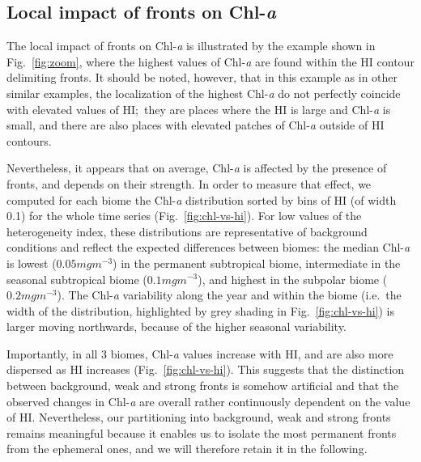 \subsection{Local impact of fronts on Chl\nobreakdash-\emph{a}}

The local impact of fronts on Chl\nobreakdash-\emph{a} is illustrated by the example shown in Fig.~\ref{fig:zoom}, where the highest values of Chl\nobreakdash-\emph{a} are found within the HI contour delimiting fronts.
It should be noted, however, that in this example as in other similar examples, the localization of the highest Chl\nobreakdash-\emph{a} do not perfectly coincide with elevated values of HI;\ they are places where the HI is large and Chl\nobreakdash-\emph{a} is small, and there are also places with elevated patches of Chl\nobreakdash-\emph{a} outside of HI contours.

Nevertheless, it appears that on average, Chl\nobreakdash-\emph{a} is affected by the presence of fronts, and depends on their strength.
In order to measure that effect, we computed for each biome the Chl\nobreakdash-\emph{a} distribution sorted by bins of HI (of width 0.1) for the whole time series (Fig.~\ref{fig:chl-vs-hi}).
For low values of the heterogeneity index, these distributions are representative of background conditions and reflect the expected differences between biomes: the median Chl\nobreakdash-\emph{a} is lowest (\(0.05 mg m^{-3}\)) in the permanent subtropical biome, intermediate in the seasonal subtropical biome (\(0.1 mg m^{-3}\)), and highest in the subpolar biome (\(0.2 mg m^{-3}\)).
The Chl\nobreakdash-\emph{a} variability along the year and within the biome (i.e.\ the width of the distribution, highlighted by grey shading in Fig.~\ref{fig:chl-vs-hi}) is larger moving northwards, because of the higher seasonal variability.

Importantly, in all 3 biomes, Chl\nobreakdash-\emph{a} values increase with HI, and are also more dispersed as HI increases (Fig.~\ref{fig:chl-vs-hi}).
This suggests that the distinction between background, weak and strong fronts is somehow artificial and that the observed changes in Chl\nobreakdash-\emph{a} are overall rather continuously dependent on the value of HI.\@
Nevertheless, our partitioning into background, weak and strong fronts remains meaningful because it enables us to isolate the most permanent fronts from the ephemeral ones, and we will therefore retain it in the following.


